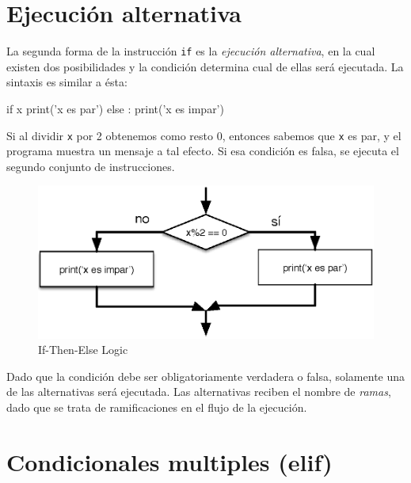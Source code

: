 \hypertarget{ejecuciuxf3n-alternativa}{%
\section{Ejecución alternativa}\label{ejecuciuxf3n-alternativa}}

 

La segunda forma de la instrucción \texttt{if} es la \emph{ejecución
alternativa}, en la cual existen dos posibilidades y la condición
determina cual de ellas será ejecutada. La sintaxis es similar a ésta:

\begin{python}[frame=single]
if x%
    print('x es par')
else :
    print('x es impar')
\end{python}

Si al dividir \texttt{x} por 2 obtenemos como resto 0, entonces sabemos
que \texttt{x} es par, y el programa muestra un mensaje a tal efecto. Si
esa condición es falsa, se ejecuta el segundo conjunto de instrucciones.

\begin{figure}[t]
\centering
\includegraphics{images/if-else.eps}
\caption{If-Then-Else Logic}
\label{fig:if-else}
\end{figure}

Dado que la condición debe ser obligatoriamente verdadera o falsa,
solamente una de las alternativas será ejecutada. Las alternativas
reciben el nombre de \emph{ramas}, dado que se trata de ramificaciones
en el flujo de la ejecución.


\hypertarget{condicionales-multiples-elif}{%
\section{Condicionales multiples
(elif)}\label{condicionales-multiples-elif}}

